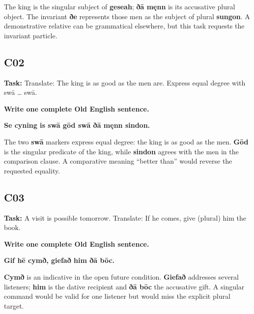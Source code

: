 The king is the singular subject of \textbf{geseah}; \textbf{ðā męnn} is its accusative plural object. The invariant \textbf{ðe} represents those men as the subject of plural \textbf{sungon}. A demonstrative relative can be grammatical elsewhere, but this task requests the invariant particle.

\subsection*{C02}

\textbf{Task:} Translate: The king is as good as the men are. Express equal degree with swā … swā.

\textbf{Write one complete Old English sentence.}

\textbf{Se cyning is swā gōd swā ðā męnn sindon.}

The two \textbf{swā} markers express equal degree: the king is as good as the men. \textbf{Gōd} is the singular predicate of the king, while \textbf{sindon} agrees with the men in the comparison clause. A comparative meaning “better than” would reverse the requested equality.

\subsection*{C03}

\textbf{Task:} A visit is possible tomorrow. Translate: If he comes, give (plural) him the book.

\textbf{Write one complete Old English sentence.}

\textbf{Gif hē cymð, giefað him ðā bōc.}

\textbf{Cymð} is an indicative in the open future condition. \textbf{Giefað} addresses several listeners; \textbf{him} is the dative recipient and \textbf{ðā bōc} the accusative gift. A singular command would be valid for one listener but would miss the explicit plural target.


